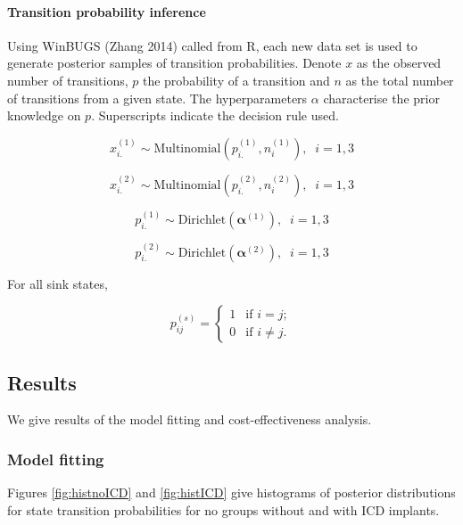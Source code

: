 \documentclass[
]{article}
\begin{document}
\hypertarget{transition-probability-inference}{%
\paragraph{Transition probability inference}\label{transition-probability-inference}}

Using WinBUGS (Zhang 2014) called from R, each new data set is used to generate posterior samples of transition probabilities.
Denote \(x\) as the observed number of transitions, \(p\) the probability of a transition and \(n\) as the total number of transitions from a given state.
The hyperparameters \(\alpha\) characterise the prior knowledge on \(p\).
Superscripts indicate the decision rule used.

\[x^{(1)}_{i.} \sim \mbox{Multinomial}(p^{(1)}_{i.}, n^{(1)}_i), \;\; i = 1,3\]

\[x^{(2)}_{i.} \sim \mbox{Multinomial}(p^{(2)}_{i.}, n^{(2)}_i), \;\; i = 1,3\]

\[p^{(1)}_{i.} \sim \mbox{Dirichlet}(\boldsymbol{\alpha}^{(1)} ), \;\; i = 1,3\]

\[p^{(2)}_{i.} \sim \mbox{Dirichlet}(\boldsymbol{\alpha}^{(2)} ), \;\; i = 1,3\]

For all sink states,

\[
p^{(s)}_{ij} = \left\{
\begin{array}{ll}
1 & \mbox{if $i = j$};\\
0 & \mbox{if $i \neq j$}.
\end{array} \right.
\]

\hypertarget{results}{%
\subsection{Results}\label{results}}

We give results of the model fitting and cost-effectiveness analysis.

\hypertarget{model-fitting}{%
\subsubsection{Model fitting}\label{model-fitting}}

Figures \ref{fig:histnoICD} and \ref{fig:histICD} give histograms of posterior distributions for state transition probabilities for no groups without and with ICD implants.
\end{document}
